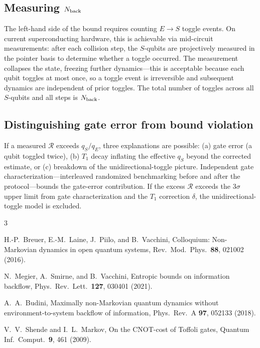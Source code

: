\documentclass[aps,pra,onecolumn]{revtex4-2}
\begin{document}
\subsection{Measuring $N_{\rm back}$}

The left-hand side of the bound requires counting $E \to S$ toggle events. On current superconducting hardware, this is achievable via mid-circuit measurements: after each collision step, the $S$-qubits are projectively measured in the pointer basis to determine whether a toggle occurred. The measurement collapses the state, freezing further dynamics---this is acceptable because each qubit toggles at most once, so a toggle event is irreversible and subsequent dynamics are independent of prior toggles. The total number of toggles across all $S$-qubits and all steps is $N_{\rm back}$.

\subsection{Distinguishing gate error from bound violation}

If a measured $\mathcal{R}$ exceeds $q_S/q_E$, three explanations are possible: (a) gate error (a qubit toggled twice), (b) $T_1$ decay inflating the effective $q_S$ beyond the corrected estimate, or (c) breakdown of the unidirectional-toggle picture. Independent gate characterization---interleaved randomized benchmarking before and after the protocol---bounds the gate-error contribution. If the excess $\mathcal{R}$ exceeds the $3\sigma$ upper limit from gate characterization and the $T_1$ correction $\delta$, the unidirectional-toggle model is excluded.

\begin{thebibliography}{3}

H.-P.~Breuer, E.-M.~Laine, J.~Piilo, and B.~Vacchini,
Colloquium: Non-Markovian dynamics in open quantum systems,
Rev.\ Mod.\ Phys.\ \textbf{88}, 021002 (2016).

N.~Megier, A.~Smirne, and B.~Vacchini,
Entropic bounds on information backflow,
Phys.\ Rev.\ Lett.\ \textbf{127}, 030401 (2021).

A.~A.~Budini,
Maximally non-Markovian quantum dynamics without environment-to-system backflow of information,
Phys.\ Rev.\ A \textbf{97}, 052133 (2018).

V.~V.~Shende and I.~L.~Markov,
On the CNOT-cost of Toffoli gates,
Quantum Inf.\ Comput.\ \textbf{9}, 461 (2009).

\end{thebibliography}
\end{document}

